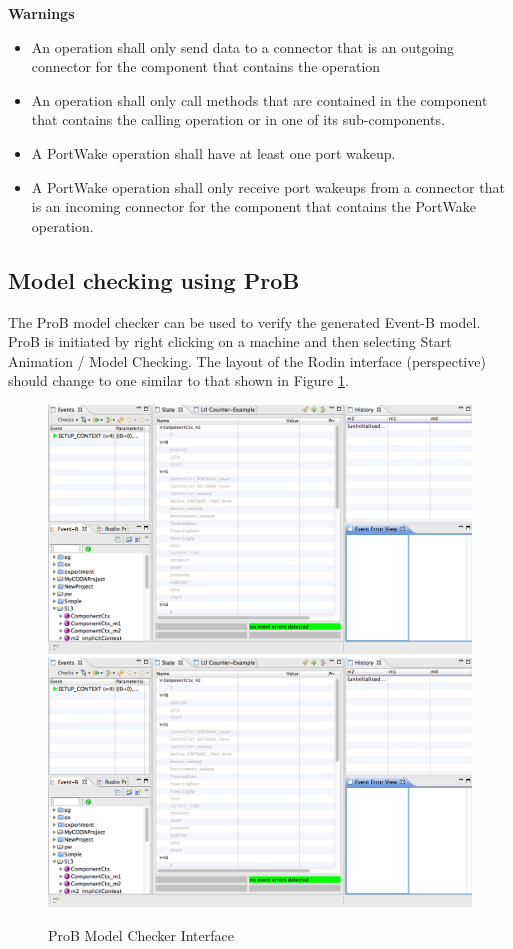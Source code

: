 \textbf{Warnings}

\begin{itemize}
\item An operation shall only send data to a connector that is an outgoing connector for the component that contains the operation
\item An operation shall only call methods that are contained in the component that contains the calling operation or in one of its sub-components.
\item A PortWake operation shall have at least one port wakeup.
\item A PortWake operation shall only receive port wakeups from a connector that is an incoming connector for the component that contains the PortWake operation.
\end{itemize}


\subsection{Model checking using ProB}
The ProB model checker can be used to verify the generated Event-B model. ProB is initiated by right clicking on a machine and then selecting Start Animation / Model Checking. The layout of the Rodin interface (perspective) should change to one similar to that shown in Figure \ref{fig:ProBModelCheckerInterface}.
 
\begin{figure}[!htbp]
  \centering
  \ifplastex
  \includegraphics[width=1024]{figures/image8.png}
  \else
  \includegraphics[width=1\textwidth]{figures/image8.png}
  \fi
  \caption{ProB Model Checker Interface}
  \label{fig:ProBModelCheckerInterface}
\end{figure}


